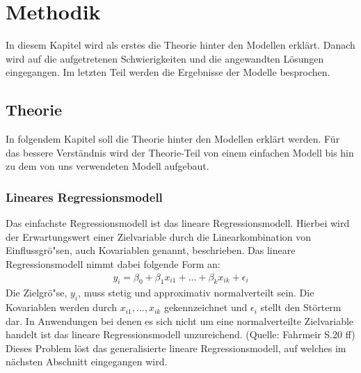 \chapter{Methodik}
In diesem Kapitel wird als erstes die Theorie hinter den Modellen erklärt. Danach wird auf die aufgetretenen Schwierigkeiten und die angewandten Lösungen eingegangen. Im letzten Teil werden die Ergebnisse der Modelle besprochen.

\section{Theorie}
In folgendem Kapitel soll die Theorie hinter den Modellen erklärt werden. Für das bessere Verständnis wird der Theorie-Teil von einem einfachen Modell bis hin zu dem von uns verwendeten Modell aufgebaut.

\subsection{Lineares Regressionsmodell}
Das einfachste Regressionsmodell ist das lineare Regressionsmodell. Hierbei wird der Erwartungswert einer Zielvariable durch die Linearkombination von Einflussgrö"sen, auch Kovariablen genannt, beschrieben. Das lineare Regressionsmodell nimmt dabei folgende Form an:
\begin{align}
y_{i}= \beta_{0}+\beta_{1}x_{i1}+...+\beta_{k}x_{ik}+\epsilon_{i}
\end{align}
Die Zielgrö"se, $y_{i}$, muss stetig und approximativ normalverteilt sein. Die Kovariablen werden durch $x_{i1},...,x_{ik}$ gekennzeichnet und $\epsilon_{i}$ stellt den Störterm dar. In Anwendungen bei denen es sich nicht um eine normalverteilte Zielvariable handelt ist das lineare Regressionsmodell unzureichend. (Quelle: Fahrmeir S.20 ff) \\
Dieses Problem löst das generalisierte lineare Regressionsmodell, auf welches im nächsten Abschnitt eingegangen wird. 

